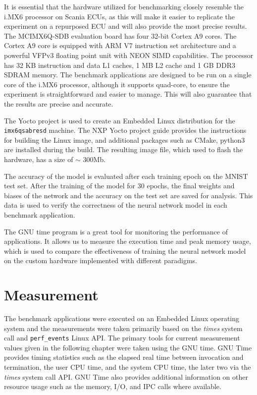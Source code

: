 It is essential that the hardware utilized for benchmarking closely resemble the i.MX6 processor on Scania ECUs, as this will make it easier to replicate the experiment on a repurposed ECU and will also provide the most precise results. The MCIMX6Q-SDB evaluation board has four 32-bit Cortex A9 cores. The Cortex A9 core is equipped with ARM V7 instruction set architecture and a powerful VFPv3 floating point unit with NEON SIMD capabilities. The processor has 32 KB instruction and data L1 caches, 1 MB L2 cache and 1 GB DDR3 SDRAM memory. The benchmark applications are designed to be run on a single core of the i.MX6 processor, although it supports quad-core, to ensure the experiment is straightforward and easier to manage. This will also guarantee that the results are precise and accurate.

The Yocto project is used to create an Embedded Linux distribution for the \texttt{imx6qsabresd} machine. The NXP Yocto project guide \cite{nxp-yocto} provides the instructions for building the Linux image, and additional packages such as CMake, python3 are installed during the build. The resulting image file, which used to flash the hardware, has a size of $\sim$ 300Mb.

The accuracy of the model is evaluated after each training epoch on the MNIST test set. After the training of the model for 30 epochs, the final weights and biases of the network and the accuracy on the test set are saved for analysis. This data is used to verify the correctness of the neural network model in each benchmark application.

The GNU time program is a great tool for monitoring the performance of applications. It allows us to measure the execution time and peak memory usage, which is used to compare the effectiveness of training the neural network model on the custom hardware implemented with different paradigms.


\chapter{Measurement}

The benchmark applications were executed on an Embedded Linux operating system and the measurements were taken primarily based on the \textit{times} system call and \texttt{perf\_events} Linux API. The primary tools for current measurement values given in the following chapter were taken using the GNU time. GNU Time provides timing statistics such as the elapsed real time between invocation and termination, the user CPU time, and the system CPU time, the later two via the \textit{times} system call API. GNU Time also provides additional information on other resource usage such as the memory, I/O, and IPC calls where available.

